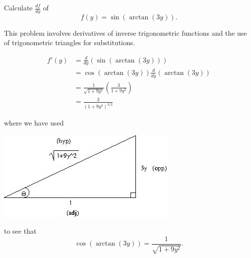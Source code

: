 \documentclass{ximera}
\author{Emma Smith Zbarsky}
\begin{document}
\begin{exercise}

Calculate $\frac{df}{dy}$ of \[f(y) = \sin\left(\arctan(3y)\right).\]


\begin{hint}
This problem involves derivatives of inverse trigonometric functions and
the use of trigonometric triangles for substitutions.
\end{hint}


\begin{hint}
\begin{align*}
f'(y) &= \frac{d}{dy}\left(\sin\left(\arctan(3y)\right)\right) \\
&= \cos(\arctan(3y))\frac{d}{dy}\left(\arctan(3y)\right) \\
&=  \frac{1}{\sqrt{1+9y^2}}\left(\frac{3}{1+9y^2}\right) \\
&= \frac{3}{\left(1+9y^2\right)^{3/2}}
\end{align*}

where we have used 

\begin{image}\includegraphics[width=.5\textwidth]{trig-triangle-arctan3y.jpg}\end{image}

 to see that
\[\cos\left(\arctan(3y)\right) = \frac{1}{\sqrt{1+9y^2}}.\]
\end{hint}


\begin{multipleChoice}
\end{multipleChoice}

\end{exercise}
\end{document}
